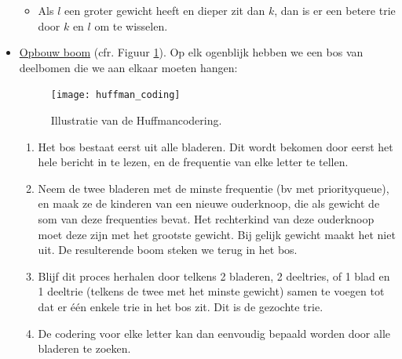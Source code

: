 \documentclass{report}
\begin{document}
\begin{itemize}
\begin{itemize}
		\item Als $l$ een groter gewicht heeft en dieper zit dan $k$, dan is er een betere trie door $k$ en $l$ om te wisselen.
	\end{itemize}
	\item[\info] \underline{Opbouw boom} (cfr. Figuur \ref{fig:huffman_coding}). Op elk ogenblijk hebben we een bos van deelbomen die we aan elkaar moeten hangen:
	\begin{figure}[ht]
		\centering
		\texttt{[image: huffman\_coding]}
		\caption{Illustratie van de Huffmancodering.}
		\label{fig:huffman_coding}
	\end{figure}
	\begin{enumerate}
		\item Het bos bestaat eerst uit alle bladeren. Dit wordt bekomen door eerst het hele bericht in te lezen, en de frequentie van elke letter te tellen.
		\item Neem de twee bladeren met de minste frequentie (bv met priorityqueue), en maak ze de kinderen van een nieuwe ouderknoop, die als gewicht de som van deze frequenties bevat. Het rechterkind van deze ouderknoop moet deze zijn met het grootste gewicht. Bij gelijk gewicht maakt het niet uit. De resulterende boom steken we terug in het bos.
		\item Blijf dit proces herhalen door telkens 2 bladeren, 2 deeltries, of 1 blad en 1 deeltrie (telkens de twee met het minste gewicht) samen te voegen tot dat er één enkele trie in het bos zit. Dit is de gezochte trie.
		\item De codering voor elke letter kan dan eenvoudig bepaald worden door alle bladeren te zoeken.
	\end{enumerate}
\end{itemize} 
\end{document}
